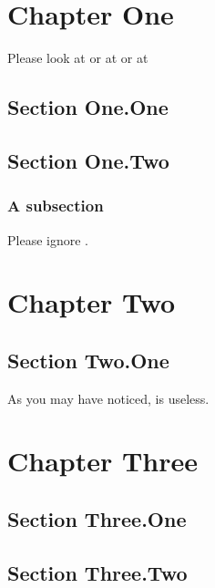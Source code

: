 \documentclass{book}
\begin{document}
\chapter{Chapter One}
  Please look at  or at  or at 


  \section{Section One.One}
  \label{mysection}
  \lipsum

  \section{Section One.Two}

  \subsection{A subsection} \label{foosubsection}
  Please ignore .
  
  \chapter{Chapter Two}
  \section{Section Two.One}

  As you may have noticed,  is useless.
  

  \chapter{Chapter Three}
  \section{Section Three.One}   %
  \section{Section Three.Two}\label{othersection}
\end{document}

